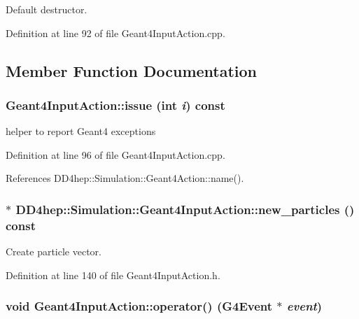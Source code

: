 Default destructor. 

Definition at line 92 of file Geant4InputAction.cpp.

\subsection{Member Function Documentation}
\hypertarget{class_d_d4hep_1_1_simulation_1_1_geant4_input_action_a8a9e4f7130f7c4fe504a8124e3b461df}{
\subsubsection[{issue}]{ Geant4InputAction::issue (int {\em i}) const}}
\label{class_d_d4hep_1_1_simulation_1_1_geant4_input_action_a8a9e4f7130f7c4fe504a8124e3b461df}


helper to report Geant4 exceptions 

Definition at line 96 of file Geant4InputAction.cpp.

References DD4hep::Simulation::Geant4Action::name().\hypertarget{class_d_d4hep_1_1_simulation_1_1_geant4_input_action_a02f251581f79344e42e1298ecb2812bb}{
\subsubsection[{new\_\-particles}]{$\ast$ DD4hep::Simulation::Geant4InputAction::new\_\-particles () const}}
\label{class_d_d4hep_1_1_simulation_1_1_geant4_input_action_a02f251581f79344e42e1298ecb2812bb}


Create particle vector. 

Definition at line 140 of file Geant4InputAction.h.\hypertarget{class_d_d4hep_1_1_simulation_1_1_geant4_input_action_abda8423a68e04eec20eb52c01883c0ba}{
\subsubsection[{operator()}]{\setlength{\rightskip}{0pt plus 5cm}void Geant4InputAction::operator() (G4Event $\ast$ {\em event})}}
\label{class_d_d4hep_1_1_simulation_1_1_geant4_input_action_abda8423a68e04eec20eb52c01883c0ba}


